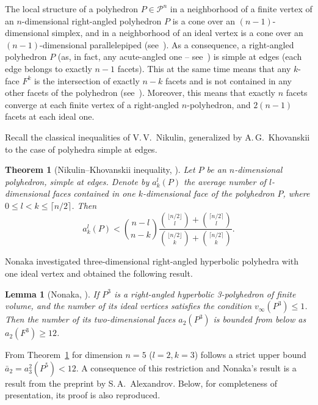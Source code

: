 \documentclass[12pt]{amsart}
\newtheorem{theorem}{Theorem}[section]
\newtheorem{lemma}{Lemma}[section]
\theoremstyle{definition}
\begin{document}
	The local structure of a polyhedron $P \in \mathcal{P}^n$ in a neighborhood of a finite vertex of an $n$-dimensional right-angled polyhedron $P$ is a cone over an $(n-1)$-dimensional simplex, and in a neighborhood of an ideal vertex is a cone over an $(n-1)$-dimensional parallelepiped (see~\cite{Dufour2010}). As a consequence, a right-angled polyhedron $P$ (as, in fact, any acute-angled one -- see~\cite{AVS}) is simple at edges (each edge belongs to exactly $n-1$ facets). This at the same time means that any $k$-face $F^k$ is the intersection of exactly $n-k$ facets and is not contained in any other facets of the polyhedron (see~\cite{AVS}). Moreover, this means that exactly $n$ facets converge at each finite vertex of a right-angled $n$-polyhedron, and $2(n-1)$ facets at each ideal one.
	
	Recall the classical inequalities of V.\,V.~Nikulin, generalized by A.\,G.~Khovanskii to the case of polyhedra simple at edges.
	
	\begin{theorem}[Nikulin--Khovanskii inequality, \cite{Nik81, Kho86}] \label{thm:nikulin}
		Let $P$ be an $n$-dimensional polyhedron, simple at edges. Denote by $a_k^l(P)$ the average number of $l$-dimensional faces contained in one $k$-dimensional face of the polyhedron $P$, where $0 \leq l < k \leq \lceil n/2 \rceil$. Then
		\begin{equation}
			a_k^l(P) < \binom{n-l}{n-k} \frac{\binom{\lfloor n/2 \rfloor}{l} + \binom{\lceil n/2 \rceil}{l}}{\binom{\lfloor n/2 \rfloor}{k} + \binom{\lceil n/2 \rceil}{k}}.
		\end{equation}
	\end{theorem}
	
	Nonaka investigated three-dimensional right-angled hyperbolic polyhedra with one ideal vertex and obtained the following result.
	
	\begin{lemma}[Nonaka, \cite{Nonaka}] \label{lem:nonaka_bound}
		If $P^3$ is a right-angled hyperbolic 3-polyhedron of finite volume, and the number of its ideal vertices satisfies the condition $v_\infty(P^3) \le 1$. Then the number of its two-dimensional faces $a_2(P^3)$ is bounded from below as $a_2(F^3) \ge 12$.
	\end{lemma}
	
	From Theorem~\ref{thm:nikulin} for dimension $n=5$ ($l=2, k=3$) follows a strict upper bound $\bar{a}_2 = a_3^2(P^5) < 12$. A consequence of this restriction and Nonaka's result is a result from the preprint by S.\,A.~Alexandrov. Below, for completeness of presentation, its proof is also reproduced.
	
\end{document}
